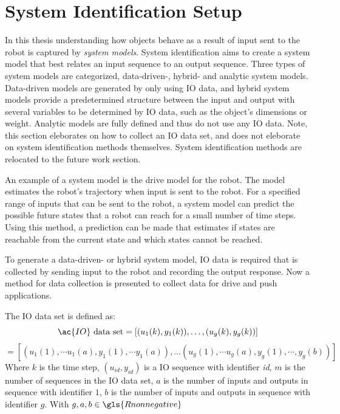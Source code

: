 \section{System Identification Setup}%
\label{sec:sys_iden}
In this thesis understanding how objects behave as a result of input sent to the robot is captured by \textit{system models}. System identification aims to create a system model that best relates an input sequence to an output sequence. Three types of system models are categorized, data-driven-, hybrid- and analytic system models. Data-driven models are generated by only using \ac{IO} data, and hybrid system models provide a predetermined structure between the input and output with several variables to be determined by \ac{IO} data, such as the object's dimensions or weight. Analytic models are fully defined and thus do not use any \ac{IO} data. Note, this section eleborates on how to collect an \ac{IO} data set, and does not eleborate on system identification methods themselves. System identification methods are relocated to the future work section.\bs

An example of a system model is the drive model for the robot. The model estimates the robot's trajectory when input is sent to the robot. For a specified range of inputs that can be sent to the robot, a system model can predict the possible future states that a robot can reach for a small number of time steps. Using this method, a prediction can be made that estimates if states are reachable from the current state and which states cannot be reached.\bs

To generate a data-driven- or hybrid system model, \ac{IO} data is required that is collected by sending input to the robot and recording the output response. Now a method for data collection is presented to collect data for drive and push applications.\bs

The \ac{IO} data set is defined as:
\[ \ac{IO} \textrm{ data set} = \left[(u_1(k), y_1(k)), \dots, (u_g(k), y_g(k)) \right]\]
\[= \left[(u_1(1), \cdots u_1(a), y_1(1), \cdots y_1(a)), \dots (u_g(1), \cdots u_g(a), y_g(1), \cdots, y_g(b)) \right]\]
Where $k$ is the time step, $(u_\mathit{id}, y_\mathit{id})$ is a \ac{IO} sequence with identifier \textit{id}, $m$ is the number of sequences in the \ac{IO} data set, $a$ is the number of inputs and outputs in sequence with identifier $1$, $b$ is the number of inputs and outputs in sequence with identifier $g$. With $g, a, b \in \gls{Rnonnegative}$\bs

